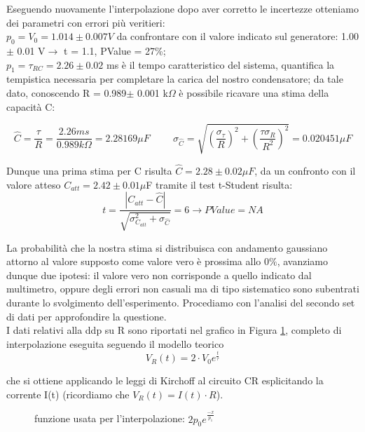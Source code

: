 \documentclass[a4paper]{article}
\theoremstyle{definition}
\begin{document}
\noindent Eseguendo nuovamente l'interpolazione dopo aver corretto le incertezze otteniamo dei parametri con errori più veritieri: \\


 \(p_{0} = V_{0} = 1.014 \pm 0.007 V \)  da confrontare con il valore indicato sul generatore: 1.00 \(\pm\) 0.01 V\(\rightarrow \) t = 1.1, PValue = 27\%;\\
 
 \(p_{1} = \tau_{RC} = 2.26 \pm 0.02 \) ms è il tempo caratteristico del sistema, quantifica la tempistica necessaria per completare la carica del nostro condensatore; da tale dato, conoscendo R = 0.989\(\pm\) 0.001 k\(\Omega\) è possibile ricavare una stima della capacità C:
 
\[\hat{C} = \frac{\tau}{R}=  \frac{2.26ms}{0.989 k\Omega} = 2.28169 \mu F \hspace{1cm} \sigma_{\hat{C}} = \sqrt{\left(\frac{\sigma_{\tau}}{R}\right)^{2} + \left(\frac{\tau \sigma_{R}}{R^{2}}\right)^{2}} = 0.020451 \mu F\] 

\noindent Dunque una prima stima per C risulta \(\hat{C} =  2.28 \pm 0.02 \mu F\), da un confronto con il valore atteso \(C_{att} = 2.42 \pm 0.01 \mu\)F tramite il test t-Student risulta:
\[t = \frac{\left| C_{att} - \hat{C}\right|}{\sqrt{\sigma^{2}_{C_{att}} + \sigma_{\hat{C}}}} = 6 \rightarrow PValue = NA\]

La probabilità che la nostra stima si distribuisca con andamento gaussiano attorno al valore supposto come valore vero è prossima allo 0\(\%\), avanziamo dunque due ipotesi: il valore vero non corrisponde a quello indicato dal multimetro, oppure degli errori non casuali ma di tipo sistematico sono subentrati durante lo svolgimento dell'esperimento. Procediamo con l'analisi del secondo set di dati per approfondire la questione. \\

\noindent I dati relativi alla ddp su R sono riportati nel grafico in Figura \ref{fig:RC_su_R}, completo di interpolazione eseguita seguendo il modello teorico
\[V_{R}(t) = 2 \cdot V_{0} e^{\frac{t}{\tau}}\]

che si ottiene applicando le leggi di Kirchoff al circuito CR esplicitando la corrente I(t) (ricordiamo che \(V_{R}(t) = I(t) \cdot R\)). \\

\begin{figure}[!htbp]

	\caption{funzione usata per l'interpolazione:  \(2p_{0}e^{\frac{-x}{p_{1}}}\) }

    \label{fig:RC_su_R}

\end{figure}
\end{document}
